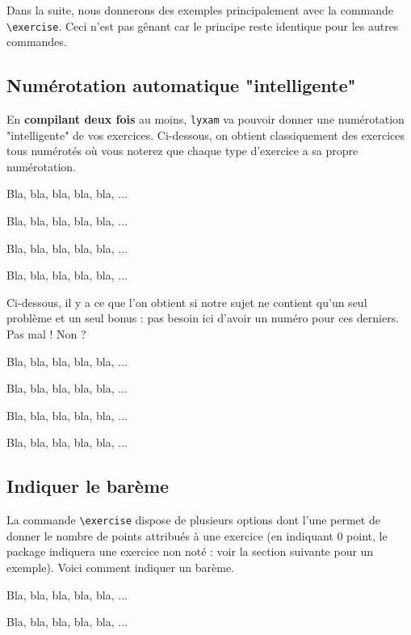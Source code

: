 \documentclass[12pt,a4paper]{article}
\makeatletter
\theoremstyle{definition}
\newcommand\resetallcnt{
		\setcounter{lyxam@counter@topic}{0}
		\setcounter{lyxam@counter@exercise}{0}
		\setcounter{lyxam@counter@problem}{0}
		\setcounter{lyxam@counter@bonus}{0}
		\setcounter{lyxam@counter@subpart}{0}
	}
\makeatother
\begin{document}
Dans la suite, nous donnerons des exemples principalement avec la commande \verb+\exercise+. Ceci n'est pas gênant car le principe reste identique pour les autres commandes.


    \subsection{Numérotation automatique "intelligente"}

En \textbf{compilant deux fois} au moins, \verb+lyxam+ va pouvoir donner une numérotation "intelligente" de vos exercices. Ci-dessous, on obtient classiquement des exercices tous numérotés où vous noterez que chaque type d'exercice a sa propre numérotation.


\begin{tcblisting}{}
\exercise
Bla, bla, bla, bla, bla, ...

\exercise
Bla, bla, bla, bla, bla, ...

\problem
Bla, bla, bla, bla, bla, ...

\problem
Bla, bla, bla, bla, bla, ...
\end{tcblisting}


Ci-dessous, il y a ce que l'on obtient si notre sujet ne contient qu'un seul problème et un seul bonus : pas besoin ici d'avoir un numéro pour ces derniers. Pas mal ! Non ?

\resetallcnt{}

\begin{tcblisting}{}
\exercise
Bla, bla, bla, bla, bla, ...

\exercise
Bla, bla, bla, bla, bla, ...

\problem
Bla, bla, bla, bla, bla, ...

\bonus
Bla, bla, bla, bla, bla, ...
\end{tcblisting}



    \subsection{Indiquer le barème}

La commande \verb+\exercise+ dispose de plusieurs options dont l'une permet de donner le nombre de points attribués à une exercice (en indiquant $0$ point, le package indiquera une exercice non noté : voir la section suivante pour un exemple). Voici comment indiquer un barème.

\resetallcnt{}

\begin{tcblisting}{}
\exercise[pts = 5]
Bla, bla, bla, bla, bla, ...

\exercise[pts = 15]
Bla, bla, bla, bla, bla, ...
\end{tcblisting}
\end{document}
